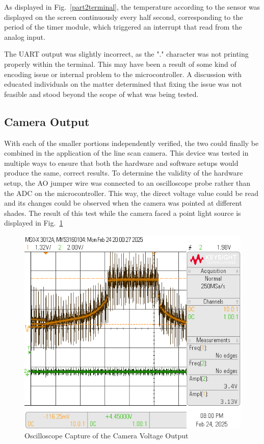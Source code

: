 \documentclass[conference]{IEEEtran}
\begin{document}
As displayed in Fig.~\ref{part2terminal}, the temperature according to the
sensor was displayed on the screen continuously every half second, corresponding to
the period of the timer module, which triggered an interrupt that read from the
analog input.

The UART output was slightly incorrect, as the "." character was not printing
properly within the terminal. This may have been a result of some kind of
encoding issue or internal problem to the microcontroller. A discussion with
educated individuals on the matter determined that fixing the
issue was not feasible and stood beyond the scope of what was being tested.

\subsection{Camera Output}

With each of the smaller portions independently verified, the two could
finally be combined in the application of the line scan camera. This device
was tested in multiple ways to ensure that both the hardware and software
setups would produce the same, correct results. To determine the validity of
the hardware setup, the AO jumper wire was connected to an oscilloscope probe
rather than the ADC on the microcontroller. This way, the direct voltage value
could be read and its changes could be observed when the camera was
pointed at different shades. The result of this test while the camera faced 
a point light source is displayed in Fig.~\ref{oscilloscope}

\begin{figure}
    \centering
    \includegraphics[width=\linewidth]{images/part3scope.png}
    \caption{Oscilloscope Capture of the Camera Voltage Output}
    \label{oscilloscope}
\end{figure}
\end{document}
